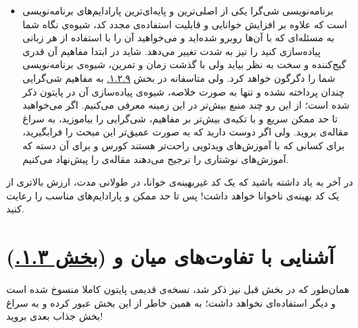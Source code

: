 \documentclass[11pt, a4paper]{article}
\begin{document}
\begin{itemize}[label=\Large $\bullet$]
  \item
  برنامه‌نویسی شی‌گرا یکی از اصلی‌ترین و پایه‌ای‌ترین پارادایم‌های برنامه‌نویسی است
  که علاوه بر افزایش خوانایی و قابلیت استفاده‌ی مجدد کد،
  شیوه‌ی نگاه شما به مسئله‌ای که با آن‌ها روبرو شده‌اید
  و می‌خواهید آن را با استفاده از هر زبانی پیاده‌سازی کنید را نیز به شدت تغییر می‌دهد.
  شاید در ابتدا مفاهیم آن قدری گیج‌کننده و سخت به نظر بیاید ولی با گذشت زمان و تمرین،
  شیوه‌ی برنامه‌نویسی شما را دگرگون خواهد کرد.
  ولی متاسفانه در بخش
  \href{https://scipy-lectures.org/intro/language/oop.html}{۱.۲.۹.}
  به مفاهیم شی‌گرایی چندان پرداخته نشده و تنها به صورت خلاصه، شیوه‌ی پیاده‌سازی‌ آن در پایتون ذکر شده است؛
  از این رو چند منبع بیش‌تر در این زمینه معرفی می‌کنیم.
  اگر می‌خواهید تا حد ممکن سریع و با تکیه‌ی بیش‌تر بر مفاهیم، شی‌گرایی را بیاموزید،
  به سراغ مقاله‌ی
  \href{https://towardsdatascience.com/understand-o-o-p-in-python-with-one-article-bfa76f3ba48c}{}
  بروید.
  ولی اگر دوست دارید که به صورت عمیق‌تر این مبحث را فرابگیرید،
  برای کسانی که با آموزش‌های ویدئویی راحت‌تر هستند کورس
  \href{https://learn.datacamp.com/courses/object-oriented-programming-in-python}{}
  و برای آن دسته که آموزش‌های نوشتاری را ترجیح می‌دهند مقاله‌ی
  \href{https://realpython.com/python3-object-oriented-programming/}{}
  را پیش‌نهاد می‌کنیم.
\end{itemize}

در آخر به یاد داشته باشید که یک کد غیربهینه‌ی خوانا،
در طولانی مدت،
ارزش بالاتری از یک کد بهینه‌ی ناخوانا خواهد داشت!
پس تا حد ممکن
و پارادایم‌های مناسب را رعایت کنید.


\section{آشنایی با تفاوت‌های میان  و  (\href{https://scipy-lectures.org/intro/python_2_python_3.html}{بخش ۱.۳.})}
همان‌طور که در بخش قبل نیز ذکر شد،
نسخه‌ی قدیمی پایتون کاملا منسوخ شده است و دیگر استفاده‌ای نخواهد داشت؛
به همین خاطر از این بخش عبور کرده و به سراغ بخش جذاب بعدی بروید!
\end{document}
